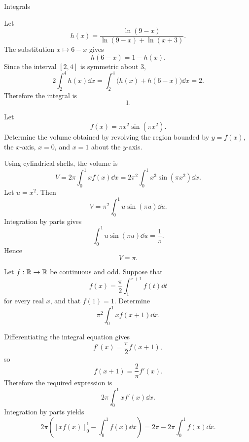 \begin{expectedproblemgroup}{Integrals}
        \begin{expectedsubsolution}
            Let
            \[
                h(x)
                =
                \frac{\ln(9-x)}{
                    \ln(9-x)+\ln(x+3)
                }.
            \]
            The substitution $x\mapsto6-x$ gives
            \[
                h(6-x)=1-h(x).
            \]
            Since the interval $[2,4]$ is symmetric about $3$,
            \[
                2\int_2^4h(x)\dd x
                =
                \int_2^4\bigl(h(x)+h(6-x)\bigr)\dd x
                =2.
            \]
            Therefore the integral is
            \[
                \boxed{1}.
            \]
        \end{expectedsubsolution}

        \begin{expectedsubproblem}
            Let
            \[
                f(x)=\pi x^2\sin(\pi x^2).
            \]
            Determine the volume obtained by revolving the region bounded by
            $y=f(x)$, the $x$-axis, $x=0$, and $x=1$ about the $y$-axis.
        \end{expectedsubproblem}

        \begin{expectedsubsolution}
            Using cylindrical shells, the volume is
            \[
                V
                =
                2\pi\int_0^1x f(x)\dd x
                =
                2\pi^2\int_0^1x^3\sin(\pi x^2)\dd x.
            \]
            Let $u=x^2$. Then
            \[
                V
                =
                \pi^2\int_0^1u\sin(\pi u)\dd u.
            \]
            Integration by parts gives
            \[
                \int_0^1u\sin(\pi u)\dd u=\frac1\pi.
            \]
            Hence
            \[
                \boxed{V=\pi}.
            \]
        \end{expectedsubsolution}

        \begin{expectedsubproblem}[2014 CSAT]
            Let $f:\mathbb{R}\to\mathbb{R}$ be continuous and odd. Suppose that
            \[
                f(x)
                =
                \frac{\pi}{2}
                \int_1^{x+1}f(t)\dd t
            \]
            for every real $x$, and that $f(1)=1$. Determine
            \[
                \pi^2\int_0^1x f(x+1)\dd x.
            \]
        \end{expectedsubproblem}

        \begin{expectedsubsolution}
            Differentiating the integral equation gives
            \[
                f'(x)=\frac{\pi}{2}f(x+1),
            \]
            so
            \[
                f(x+1)=\frac{2}{\pi}f'(x).
            \]
            Therefore the required expression is
            \[
                2\pi\int_0^1x f'(x)\dd x.
            \]
            Integration by parts yields
            \[
                2\pi\left(
                    [xf(x)]_0^1-\int_0^1f(x)\dd x
                \right)
                =
                2\pi-2\pi\int_0^1f(x)\dd x.
            \]


\end{expectedsubsolution}
\end{expectedproblemgroup}
